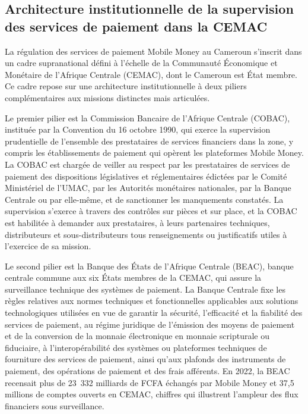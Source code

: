 \documentclass[11pt,a4paper,oneside]{report}
\theoremstyle{definition}
\theoremstyle{remark}
\begin{document}
\subsection{Architecture institutionnelle de la supervision des services de paiement dans la CEMAC}

La régulation des services de paiement Mobile Money au Cameroun s'inscrit dans un cadre supranational défini à l'échelle de la Communauté Économique et Monétaire de l'Afrique Centrale (CEMAC), dont le Cameroun est État membre. Ce cadre repose sur une architecture institutionnelle à deux piliers complémentaires aux missions distinctes mais articulées.

Le premier pilier est la Commission Bancaire de l'Afrique Centrale (COBAC), instituée par la Convention du 16 octobre 1990, qui exerce la supervision prudentielle de l'ensemble des prestataires de services financiers dans la zone, y compris les établissements de paiement qui opèrent les plateformes Mobile Money. La COBAC est chargée de veiller au respect par les prestataires de services de paiement des dispositions législatives et réglementaires édictées par le Comité Ministériel de l'UMAC, par les Autorités monétaires nationales, par la Banque Centrale ou par elle-même, et de sanctionner les manquements constatés. La supervision s'exerce à travers des contrôles sur pièces et sur place, et la COBAC est habilitée à demander aux prestataires, à leurs partenaires techniques, distributeurs et sous-distributeurs tous renseignements ou justificatifs utiles à l'exercice de sa mission.

Le second pilier est la Banque des États de l'Afrique Centrale (BEAC), banque centrale commune aux six États membres de la CEMAC, qui assure la surveillance technique des systèmes de paiement. La Banque Centrale fixe les règles relatives aux normes techniques et fonctionnelles applicables aux solutions technologiques utilisées en vue de garantir la sécurité, l'efficacité et la fiabilité des services de paiement, au régime juridique de l'émission des moyens de paiement et de la conversion de la monnaie électronique en monnaie scripturale ou fiduciaire, à l'interopérabilité des systèmes ou plateformes techniques de fourniture des services de paiement, ainsi qu'aux plafonds des instruments de paiement, des opérations de paiement et des frais afférents. En 2022, la BEAC recensait plus de 23~332 milliards de FCFA échangés par Mobile Money et 37,5 millions de comptes ouverts en CEMAC, chiffres qui illustrent l'ampleur des flux financiers sous surveillance.
\end{document}

